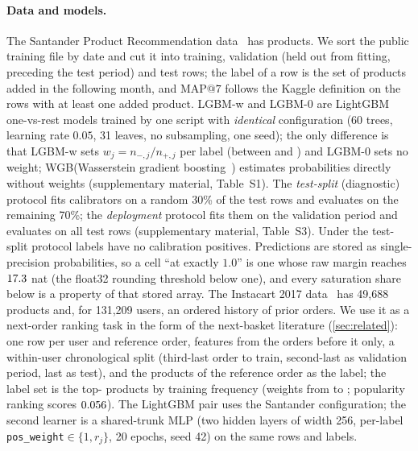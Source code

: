 \documentclass[runningheads]{llncs}
\makeatletter
\newcommand{\Sm}{\textsf{LGBM-w}\xspace}
\newcommand{\Wm}{\textsf{WGB}\xspace}
\newcommand{\Nm}{\textsf{LGBM-0}\xspace}
\newcommand{\mapseven}{\mathrm{MAP}@7\xspace}
\newcommand{\Supp}[1]{supplementary material, #1}  %
\makeatother
\begin{document}
\paragraph{Data and models.} The Santander Product Recommendation data~\cite{KaggleSantander2016} has \nnLabels{} products. We sort the public training file by date and cut it into \nnTrain{} training, \nnValRows{} validation (held out from fitting, preceding the test period) and \nnTest{} test rows; the label of a row is the set of products added in the following month, and $\mapseven$ follows the Kaggle definition on the rows with at least one added product. \Sm and \Nm are LightGBM one-vs-rest models trained by one script with \emph{identical} configuration (60 trees, learning rate $0.05$, 31 leaves, no subsampling, one seed); the only difference is that \Sm sets $w_j=n_{-,j}/n_{+,j}$ per label (between \nwMin{} and \nwMax) and \Nm sets no weight; \Wm (Wasserstein gradient boosting~\cite{Matsubara2024WGBoost}) estimates probabilities directly without weights (\Supp{Table~S1}). The \emph{test-split} (diagnostic) protocol fits calibrators on a random 30\% of the test rows and evaluates on the remaining 70\%; the \emph{deployment} protocol fits them on the validation period and evaluates on all test rows (\Supp{Table~S3}). Under the test-split protocol \nSnDead{} labels have no calibration positives. Predictions are stored as single-precision probabilities, so a cell ``at exactly $1.0$'' is one whose raw margin reaches $17.3$ nat (the float32 rounding threshold below one), and every saturation share below is a property of that stored array. The Instacart 2017 data~\cite{Instacart2017} has 49,688 products and, for 131,209 users, an ordered history of prior orders. We use it as a next-order ranking task in the form of the next-basket literature (\cref{sec:related}): one row per user and reference order, features from the orders before it only, a within-user chronological split (third-last order to train, second-last as validation period, last as test), and the products of the reference order as the label; the label set is the top-\nInLabels{} products by training frequency (weights from \nIwMin{} to \nIwMax; popularity ranking scores $0.056$). The LightGBM pair uses the Santander configuration; the second learner is a shared-trunk MLP (two hidden layers of width 256, per-label \texttt{pos\_weight}$\in\{1,r_j\}$, 20 epochs, seed 42) on the same rows and labels.
\end{document}
